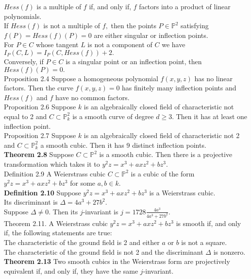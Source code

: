 \documentclass[8pt]{extarticle}
\begin{document}
$Hess(f)$ is a multiple of $f$ if, and only if, $f$ factors into a product of linear polynomials.\\
If $Hess(f)$ is not a multiple of $f,$ then the points $P \in \mathbb{P}^2$ satisfying $f(P) = Hess(f)(P) = 0$ are
either singular or inflection points.\\
For $P \in C$ whose tangent $L$ is not a component of $C$ we have $I_P (C, L) = I_P (C, Hess(f))+2.$\\
Conversely, if $P \in C$ is a singular point or an inflection point, then $Hess(f)(P)=0.$\\
Proposition 2.4 Suppose a homogeneous polynomial $f(x,y,z)$ has no linear factors. Then the curve $f(x,y,z) = 0$ has finitely many inflection points and $Hess(f)$ and $f$ have no common factors.\\
Proposition 2.6 Suppose $k$ is an algebraically closed field of characteristic not equal to 2 and $C \subset \mathbb{P}^2_k$ is a smooth curve of degree $d \ge 3.$ Then it has at least one inflection point.\\
Proposition 2.7 Suppose $k$ is an algebraically closed field of characteristic not 2 and $C \subset \mathbb{P}^2_k$ a smooth cubic. Then it has 9 distinct inflection points.\\
\textbf{Theorem 2.8} Suppose $C \subset \mathbb{P}^2$ is a smooth cubic. Then there is a projective transformation which takes it to
$y^2z = x^3 + axz^2 + bz^3.$\\
Definition 2.9 A Weierstrass cubic $C \subset \mathbb{P}^2$ is a cubic of the form $y^2z = x^3 + axz^2 + bz^3$ for some $a,b \in k.$\\
\textbf{Definition 2.10} Suppose $y^2z = x^3 + axz^2 + bz^3$ is a Weierstrass cubic.\\
Its discriminant is $\Delta = 4a^3 + 27b^2.$\\
Suppose $\Delta\neq 0.$ Then its $j$-invariant is $j = 1728\frac{4a^3}{4a^3 + 27b^2}.$\\
Theorem 2.11. A Weierstrass cubic $y^2z = x^3 +axz^2 +bz^3$ is smooth if, and only if, the following statements are true:\\
The characteristic of the ground field is 2 and either $a$ or $b$ is not a square.\\
The characteristic of the ground field is not 2 and the discriminant $\Delta$ is nonzero.\\
\textbf{Theorem 2.13} Two smooth cubics in the Weierstrass form are projectively equivalent if, and only if, they have the same $j$-invariant.\\
\end{document}
